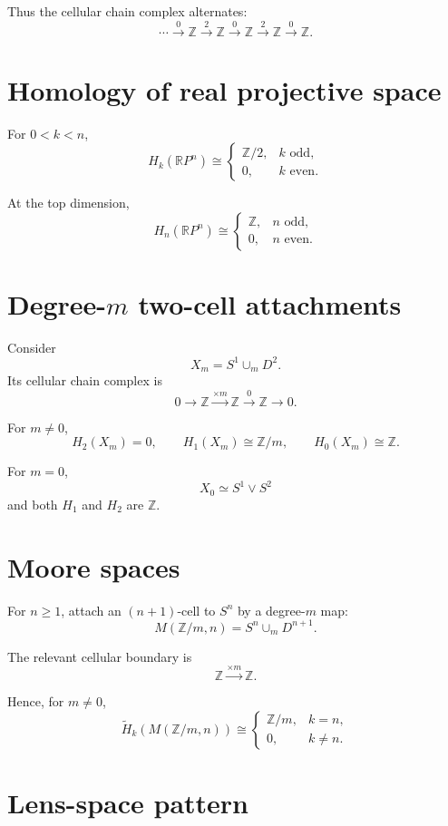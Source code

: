 Thus the cellular chain complex alternates:
\[
\cdots
\xrightarrow{0}
\mathbb Z
\xrightarrow{2}
\mathbb Z
\xrightarrow{0}
\mathbb Z
\xrightarrow{2}
\mathbb Z
\xrightarrow{0}
\mathbb Z.
\]

\section{Homology of real projective space}

For \(0<k<n\),
\[
H_k(\mathbb RP^n)\cong
\begin{cases}
\mathbb Z/2,&k\text{ odd},\\
0,&k\text{ even}.
\end{cases}
\]

At the top dimension,
\[
H_n(\mathbb RP^n)\cong
\begin{cases}
\mathbb Z,&n\text{ odd},\\
0,&n\text{ even}.
\end{cases}
\]

\section{Degree-\(m\) two-cell attachments}

Consider
\[
X_m=S^1\cup_mD^2.
\]
Its cellular chain complex is
\[
0\to\mathbb Z
\xrightarrow{\times m}
\mathbb Z
\xrightarrow{0}
\mathbb Z
\to0.
\]

For \(m\ne0\),
\[
H_2(X_m)=0,
\qquad
H_1(X_m)\cong\mathbb Z/m,
\qquad
H_0(X_m)\cong\mathbb Z.
\]

For \(m=0\),
\[
X_0\simeq S^1\vee S^2
\]
and both \(H_1\) and \(H_2\) are \(\mathbb Z\).

\section{Moore spaces}

For \(n\ge1\), attach an \((n+1)\)-cell to \(S^n\) by a degree-\(m\) map:
\[
M(\mathbb Z/m,n)
=
S^n\cup_mD^{n+1}.
\]

The relevant cellular boundary is
\[
\mathbb Z
\xrightarrow{\times m}
\mathbb Z.
\]

Hence, for \(m\ne0\),
\[
\widetilde H_k(M(\mathbb Z/m,n))
\cong
\begin{cases}
\mathbb Z/m,&k=n,\\
0,&k\ne n.
\end{cases}
\]

\section{Lens-space pattern}

